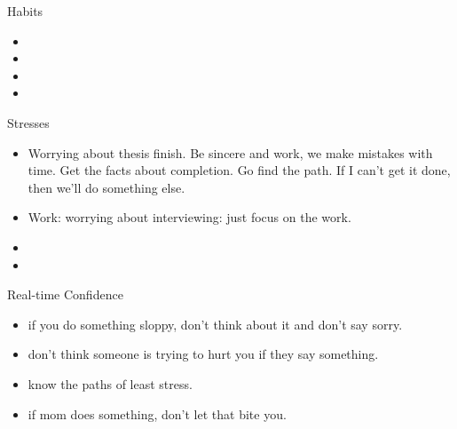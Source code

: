\documentclass[serif, mathserif, final]{beamer}
\begin{document}
\begin{frame}{} 
  \begin{columns}
    \begin{column}{0.25\linewidth} %
      \begin{block}{Habits}
        \begin{itemize}
          \tiny \item \tiny 
        \item \tiny 
        \item \tiny 
        \item \tiny 
        \end{itemize}
      \end{block}
      \begin{block}{Stresses}
        \begin{itemize}
          \tiny \item \tiny Worrying about thesis finish. Be sincere and work, we
          make mistakes with time. Get the facts about completion. Go
          find the path. If I can't get it done, then we'll do
          something else. 
          \tiny \item \tiny Work: worrying about interviewing: just
          focus on the work. 
        \item \tiny 
        \item \tiny 
        \end{itemize} 
      \end{block} 
      
     \begin{block}{Real-time Confidence}
     \begin{itemize}
       \tiny \item \tiny if you do something sloppy, don't
       think about it and don't say sorry.
     \item \tiny don't think someone is trying to hurt you if
       they say something.
     \item \tiny know the paths of least stress.
     \item \tiny if mom does something, don't let that bite you.
     \end{itemize}
     \end{block}
     

\end{column}
\end{columns}
\end{frame}
\end{document}
